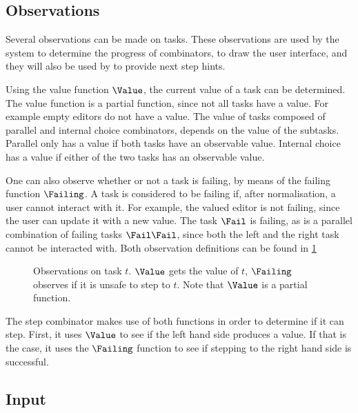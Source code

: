 \subsection{Observations}
\label{sub:observations}

Several observations can be made on tasks.
These observations are used by the system to determine the progress of combinators,
to draw the user interface, and they will also be used by \ASTOPHAT to provide next step hints.

Using the value function $\Value$, the current value of a task can be determined.
The value function is a partial function, since not all tasks have a value.
For example empty editors do not have a value.
The value of tasks composed of parallel and internal choice combinators, depends on the value of the subtasks.
Parallel only has a value if both tasks have an observable value.
Internal choice has a value if either of the two tasks has an observable value.

One can also observe whether or not a task is failing, by means of the failing function $\Failing$.
A task is considered to be failing if, after normalisation, a user cannot interact with it.
For example, the valued editor is not failing, since the user can update it with a new value.
The task $\Fail$ is failing, as is a parallel combination of failing tasks $\Fail \And \Fail$, since both the left and the right task cannot be interacted with.
Both observation definitions can be found in \cref{fig:observations}

\begin{figure}[h]
  \begin{minipage}{\textwidth}
    \centering \small
      
  \end{minipage}
  \caption{
    Observations on task $t$.
    $\Value$ gets the value of $t$, $\Failing$ observes if it is unsafe to step to $t$.
    Note that $\Value$ is a partial function.
  }
  \label{fig:observations}
\end{figure}

The step combinator makes use of both functions in order to determine if it can step.
First, it uses $\Value$ to see if the left hand side produces a value.
If that is the case, it uses the $\Failing$ function to see if stepping to the right hand side is successful.


\subsection{Input}

